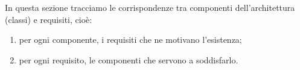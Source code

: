 


In questa sezione tracciamo le corrispondenze tra componenti dell'architettura (classi) e requisiti, cioè:
\begin{enumerate}
	\item per ogni componente, i requisiti che ne motivano l'esistenza;
	\item per ogni requisito, le componenti che servono a soddisfarlo.
\end{enumerate}







\pagebreak


